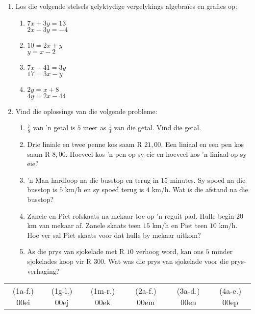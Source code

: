 \begin{eocexercises}{}
\begin{enumerate}[itemsep=5pt, label=\textbf{\arabic*}. ]
\item Los die volgende stelsels gelyktydige vergelykings algebra\"ies en grafies op:

\begin{enumerate}[itemsep=5pt,label=\textbf{(\alph*)}]
\item $7x+3y=13$\\$2x-3y=-4$  
\item $10=2x+y$\\$y=x-2$
\item $7x-41=3y$\\$17=3x-y$
\item $2y=x+8$\\$4y=2x-44$
\end{enumerate}

\item Vind die oplossings van die volgende probleme:

\begin{enumerate}[itemsep=5pt,label=\textbf{(\alph*)}]
\item $\frac{7}{8}$ van ’n getal is $5$ meer as $\frac{1}{3}$ van die getal. Vind die getal.

\item Drie liniale en twee penne kos saam R $21,00$. Een liniaal en een pen kos saam R
$8,00$. Hoeveel kos ’n pen op sy eie en hoeveel kos ’n liniaal op sy eie?

\item ’n Man hardloop na die busstop en terug in $15$ minutes. Sy spoed na die busstop is
$5$ km/h en sy spoed terug is $4$ km/h. Wat is die afstand na die busstop?
\item Zanele en Piet rolskaats na mekaar toe op ’n reguit pad. Hulle begin $20$ km van
mekaar af. Zanele skaats teen $15$ km/h en Piet teen $10$ km/h. Hoe ver sal Piet skaats
voor dat hulle by mekaar uitkom?

\item As die prys van sjokelade met R $10$ verhoog word, kan ons $5$ minder sjokelades
koop vir R $300$. Wat was die prys van sjokelade voor die prys-verhaging?

   

\end{enumerate}
\end{enumerate}
\practiceinfo
\par 
\par \begin{tabular}[h]{cccccc} 
(1a-f.) 00ei&  (1g-l.) 00ej& (1m-r.) 00ek&  (2a-f.) 00em&  (3a-d.) 00en&  (4a-e.) 00ep\end{tabular}

\end{eocexercises}